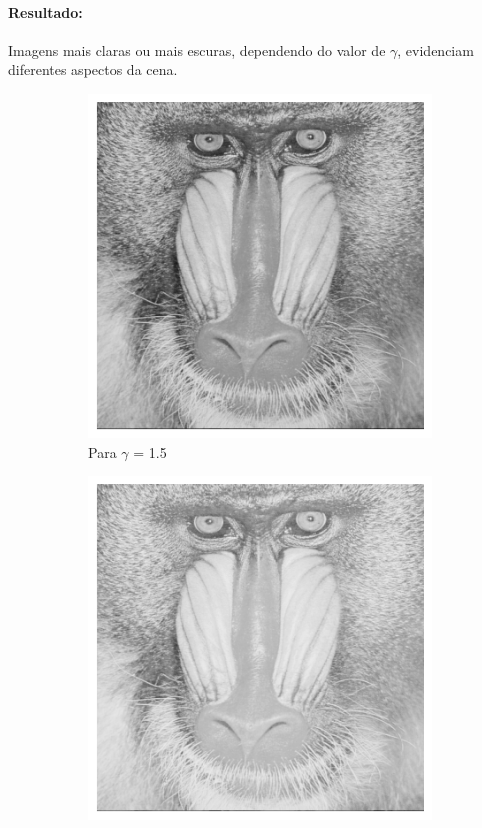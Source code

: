 \documentclass[12pt,a4paper]{report}
\begin{document}
\paragraph{Resultado:} 
Imagens mais claras ou mais escuras, dependendo do valor de \( \gamma \), evidenciam diferentes aspectos da cena.
\begin{figure}[H]
    \centering
    \begin{subfigure}[b]{0.3\textwidth}
        \includegraphics[width=\textwidth]{imagens/ex2-1.png}
        \caption{Para \( \gamma \) = 1.5 }
    \end{subfigure}
    \hfill
    \begin{subfigure}[b]{0.3\textwidth}
        \includegraphics[width=\textwidth]{imagens/ex2-2.png}

\end{subfigure}
\end{figure}
\end{document}
